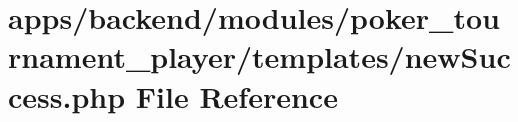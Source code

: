 \hypertarget{backend_2modules_2poker__tournament__player_2templates_2new_success_8php}{\section{apps/backend/modules/poker\-\_\-tournament\-\_\-player/templates/new\-Success.php File Reference}
\label{backend_2modules_2poker__tournament__player_2templates_2new_success_8php}
}
